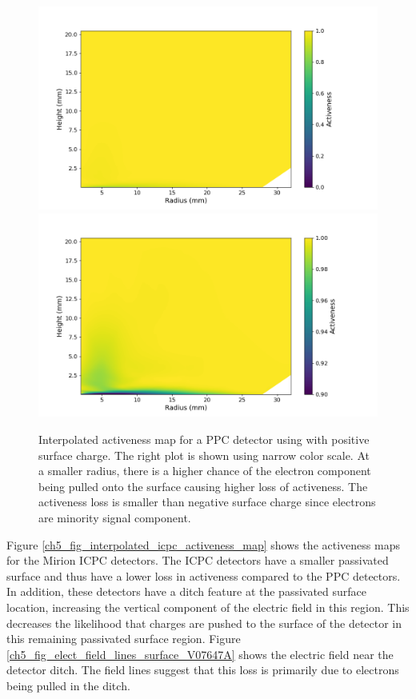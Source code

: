 \begin{figure}%
\centering
\includegraphics[trim={1cm 0cm 3.0cm 1cm},clip,width=0.49\linewidth]{ch5/figs/activeness_map_cubic_sc=0.3_ponama_1_5000_linear_full.png}
\includegraphics[trim={1cm 0cm 3.0cm 1cm},clip,width=0.49\linewidth]{ch5/figs/activeness_map_cubic_sc=0.3_ponama_1_5000_linear.png}
\caption{Interpolated activeness map for a PPC detector using \ehd with positive surface charge. The right plot is shown using narrow color scale. At a smaller radius, there is a higher chance of the electron component being pulled onto the surface causing higher loss of activeness. The activeness loss is smaller than negative surface charge since electrons are minority signal component.}
\label{ch5_fig_interpolated_activeness_map_pos}
\end{figure}

Figure \ref{ch5_fig_interpolated_icpc_activeness_map} shows the activeness maps for the Mirion ICPC detectors. The ICPC detectors have a smaller passivated surface and thus have a lower loss in activeness compared to the PPC detectors.  In addition, these detectors have a ditch feature at the passivated surface location, increasing the vertical component of the electric field in this region. This decreases the likelihood that charges are pushed to the surface of the detector in this remaining passivated surface region. Figure \ref{ch5_fig_elect_field_lines_surface_V07647A} shows the electric field near the detector ditch. The field lines suggest that this loss is primarily due to electrons being pulled in the ditch.

